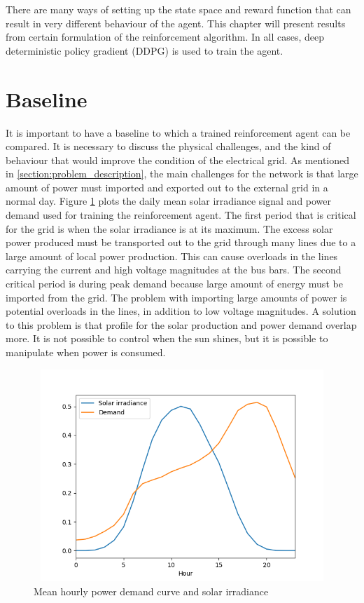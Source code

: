 \documentclass[class=book, crop=false]{standalone}
\begin{document}
There are many ways of setting up the state space and reward function that can result in very different behaviour of the agent. This chapter will present results from certain formulation of the reinforcement algorithm. In all cases, deep deterministic policy gradient (DDPG) is used to train the agent. 

\section{Baseline}
It is important to have a baseline to which a trained reinforcement agent can be compared. It is necessary to discuss the physical challenges, and the kind of behaviour that would improve the condition of the electrical grid. As mentioned in \ref{section:problem_description}, the main challenges for the network is that large amount of power must imported and exported out to the external grid in a normal day. Figure \ref{fig:results:demand_and_solar} plots the daily mean solar irradiance signal and power demand used for training the reinforcement agent. The first period that is critical for the grid is when the solar irradiance is at its maximum. The excess solar power produced must be transported out to the grid through many lines due to a large amount of local power production. This can cause overloads in the lines carrying the current and high voltage magnitudes at the bus bars. The second critical period is during peak demand because large amount of energy must be imported from the grid. The problem with importing large amounts of power is potential overloads in the lines, in addition to low voltage magnitudes. A solution to this problem is that profile for the solar production and power demand overlap more. It is not possible to control when the sun shines, but it is possible to manipulate when power is consumed.
\begin{figure}[ht]
    \center
\includegraphics[height=8cm, width=12cm]{figures/demand_and_solar.png}
    \caption[size = 9]{Mean hourly power demand curve and solar irradiance}
    \label{fig:results:demand_and_solar}
\end{figure}
\end{document}
